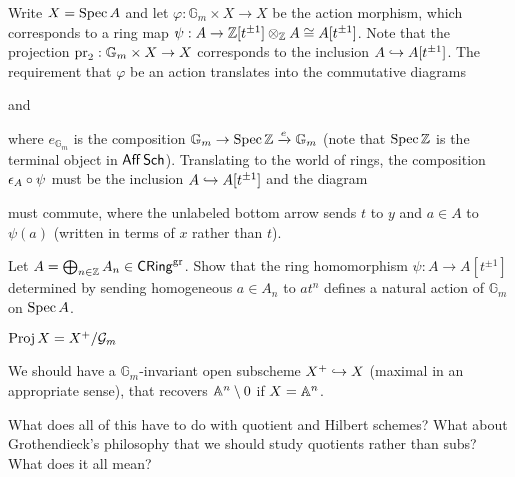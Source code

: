 \documentclass[11pt]{article}
\newcommand{\G}{\mathcal{G}}
\newcommand{\GG}{\mathbb{G}}
\renewcommand{\phi}{\varphi}
\begin{document}
Write $X=\operatorname{Spec} A$ and let $\phi: \GG_m\times X\to X$ be the action morphism, which corresponds to a ring map $\psi: A\to\mathbb{Z}[t^{\pm1}]\otimes_{\mathbb{Z}}A\cong A[t^{\pm1}]$. Note that the projection $\pr_2: \GG_m\times X\to X$ corresponds to the inclusion $A\hookrightarrow A[t^{\pm1}]$. The requirement that $\phi$ be an action translates into the commutative diagrams
\begin{center}
\end{center}
and
\begin{center}
\end{center}
where $e_{\GG_m}$ is the composition $\GG_m\to\Spec\Z\xto{e}\GG_m$ (note that $\operatorname{Spec}\mathbb{Z}$ is the terminal object in $\operatorname{\mathsf{Aff}}\operatorname{\mathsf{Sch}}$). Translating to the world of rings, the composition $\epsilon_A\circ\psi$ must be the inclusion $A\hookrightarrow A[t^{\pm1}]$ and the diagram 
\begin{center}
\end{center}
must commute, where the unlabeled bottom arrow sends $t$ to $y$ and $a\in A$ to $\psi(a)$ (written in terms of $x$ rather than $t$).

\begin{exercise}
Let $A=\bigoplus_{n\in\mathbb{Z}}A_n\in\operatorname{\mathsf{CRing}}^{\operatorname{gr}}$. Show that the ring homomorphism $\psi: A\to A[t^{\pm1}]$ determined by sending homogeneous $a\in A_n$ to $at^n$ defines a natural action of $\GG_m$ on $\operatorname{Spec} A$.
\end{exercise}

$\Proj X=X^+/\G_m$

We should have a $\GG_m$-invariant open subscheme $X^+\hookrightarrow X$ (maximal in an appropriate sense), that recovers $\mathbb{A}^n\setminus0$ if $X=\mathbb{A}^n$.

What does all of this have to do with quotient and Hilbert schemes? What about Grothendieck's philosophy that we should study quotients rather than subs? What does it all mean?
\end{document}
